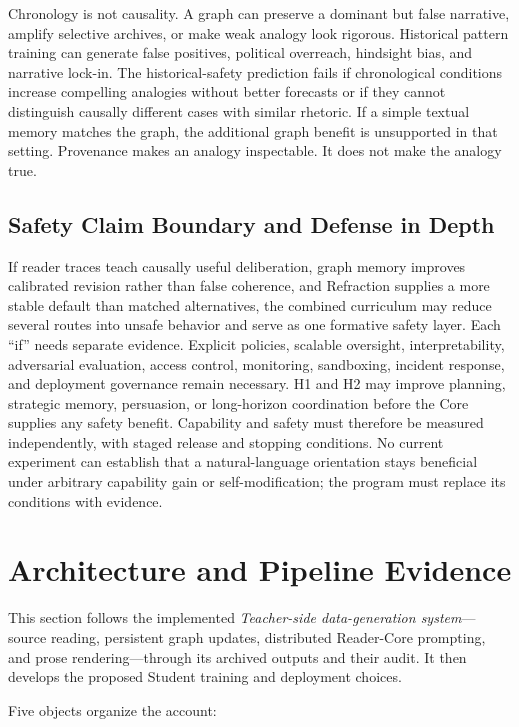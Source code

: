 \documentclass[11pt]{article}
\begin{document}
Chronology is not causality. A graph can preserve a dominant but false
narrative, amplify selective archives, or make weak analogy look rigorous.
Historical pattern training can generate false positives, political overreach,
hindsight bias, and narrative lock-in. The historical-safety prediction fails if chronological
conditions increase compelling analogies without better forecasts or if they
cannot distinguish causally different cases with similar rhetoric. If a
simple textual memory matches the graph, the additional graph benefit is
unsupported in that setting. Provenance makes an analogy
inspectable. It does not make the analogy true.

\subsection{Safety Claim Boundary and Defense in Depth}\label{sec:defense-in-depth}

If reader traces teach causally useful deliberation, graph memory improves
calibrated revision rather than false coherence, and Refraction supplies a
more stable default than matched alternatives, the combined curriculum may
reduce several routes into unsafe behavior and serve as one formative safety
layer. Each ``if'' needs separate evidence.
Explicit policies, scalable oversight,
interpretability, adversarial evaluation, access control, monitoring,
sandboxing, incident response, and deployment governance remain necessary.
H1 and H2 may improve planning, strategic memory, persuasion, or long-horizon
coordination before the Core supplies any safety benefit. Capability and safety must
therefore be measured independently, with staged release and stopping
conditions. No current experiment can establish that a natural-language
orientation stays beneficial under arbitrary capability gain or
self-modification; the program must replace its conditions with evidence.

\section{Architecture and Pipeline Evidence}\label{sec:architecture}

This section follows the implemented \emph{Teacher-side data-generation
system}---source reading, persistent graph updates, distributed Reader-Core
prompting, and prose rendering---through its archived outputs and their audit.
It then develops the proposed Student training and deployment choices.

Five objects organize the account:
\end{document}
